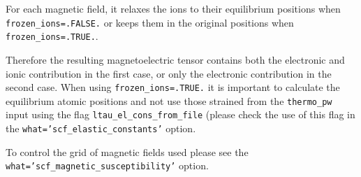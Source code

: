 \documentclass[12pt,a4paper,twoside]{report}
\begin{document}
For each magnetic field, it relaxes 
the ions to their equilibrium positions when \texttt{frozen\_ions=.FALSE.} 
or keeps them in the original positions when \texttt{frozen\_ions=.TRUE.}. 

Therefore the resulting magnetoelectric tensor contains both the electronic
and ionic contribution in the first case, or only the electronic contribution
in the second case. When using \texttt{frozen\_ions=.TRUE.} it is important
to calculate the equilibrium atomic positions and not use those strained
from the \texttt{thermo\_pw} input using the flag
\texttt{ltau\_el\_cons\_from\_file} (please check the use of this 
flag in the \texttt{what='scf\_elastic\_constants'} option.

To control the grid of magnetic fields used please see the 
\texttt{what='scf\_magnetic\_susceptibility'} option.
\end{document}
